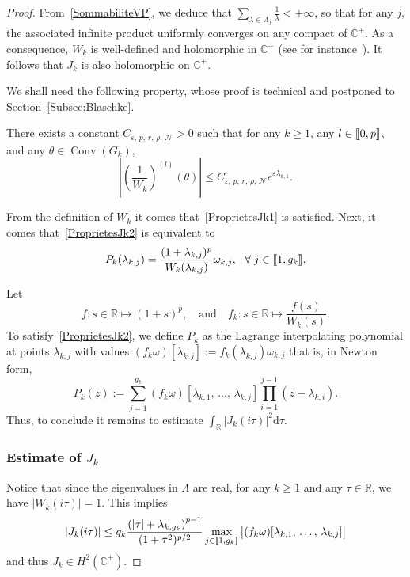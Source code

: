 \documentclass[AHL,Unicode,longabstracts]{cedram}
\DeclareMathOperator{\Conv}{Conv}
\newcommand{\llbracket}{\mathopen{[\mkern -2.7mu[}}
\newcommand{\rrbracket}{\mathclose{]\mkern -2.7mu]}}
\newcommand{\inter}[2]{\llbracket #1,#2 \rrbracket}
\newcommand{\n}{g}
\newcommand{\NN}{\mathcal{N}}
\newcommand{\R}{\mathbb{R}}
\newcommand{\C}{\mathbb{C}}
\newcommand{\md}{\mathrm{d}}
\let\oldforall\forall
\renewcommand*{\forall}{\mathrel{\oldforall}}
\begin{document}
\begin{proof}
From~\eqref{SommabiliteVP}, we deduce that $\sum_{\lambda\in \Lambda_j}\frac{1}{\lambda}<+\infty$, so that for any $j$, the associated infinite product uniformly converges on any compact of $\C^+$. As a consequence, $W_k$ is well-defined and holomorphic in $\C^+$ (see for instance~\cite[Chapter~15]{RudinAnalyseComplexe}). It follows that $J_k$ is also holomorphic on $\C^+$.

We shall need the following property, whose proof is technical and postponed to Section~\ref{Subsec:Blaschke}.

\begin{prop}\label{Proposition:Blaschke}
There exists a constant $C_{\varepsilon,\,p,\,r,\,\rho,\,\NN}>0$ such that for any $k\geq 1$, any $l \in \inter{0}{p}$, and any $\theta\in \Conv (G_k)$,
\begin{equation}\label{EstimeeFinaleBlaschke}
\left| \left(\frac{1}{W_k} \right)^{(l)}(\theta) \right| \leq C_{\varepsilon,\,p,\,r,\, \rho,\,\NN} e^{\varepsilon \lambda_{k,1}}.
\end{equation}
\end{prop}

From the definition of $W_k$ it comes that~\eqref{ProprietesJk1} is satisfied. Next, it comes that~\eqref{ProprietesJk2} is equivalent to
\[
P_k(\lambda_{k,j}) = \frac{(1+\lambda_{k,j})^p}{W_k(\lambda_{k,j})} \omega_{k,j}, \ \ \forall j\in \inter{1}{\n_k}.
\]

Let
\[
f : s \in \R \mapsto (1+s)^p,
\quad \text{and} \quad f_k : s \in \R \mapsto \frac{f(s)}{W_k(s)}.
\]
To satisfy~\eqref{ProprietesJk2}, we define $P_k$ as the Lagrange interpolating polynomial at points $\lambda_{k,j}$ with values $(f_k \omega)[\lambda_{k,j}]:=f_k(\lambda_{k,j}) \omega_{k,j}$ that is, in Newton form,
\begin{equation*}\label{Def:Pk}
P_k(z) := \sum_{j=1}^{\n_k} (f_k \omega) [\lambda_{k,1},\,\dots,\,\lambda_{k,j}] \prod_{i=1}^{j-1} (z-\lambda_{k,i}).
\end{equation*}
Thus, to conclude it remains to estimate $\displaystyle \int_\R |J_k(i \tau)|^2 \md \tau$.


\subsubsection{Estimate of $J_k$}

Notice that since the eigenvalues in $\Lambda$ are real, for any $k \geq 1$ and any $\tau \in \R$, we have $|W_k(i \tau)|=1$. This implies
\begin{equation}\label{Estimee_Jk_intermediaire}
|J_k(i \tau)| \leq \n_k \frac{\left(|\tau|+\lambda_{k,\n_k}\right)^{p-1}}{(1+\tau^2)^{p/2}} \max_{j\in \inter{1}{\n_k}} \big| (f_k \omega) [\lambda_{k,1},\,\dots,\, \lambda_{k,j}] \big|
\end{equation}
and thus $J_k \in H^2(\C^+)$.



\end{proof}
\end{document}
